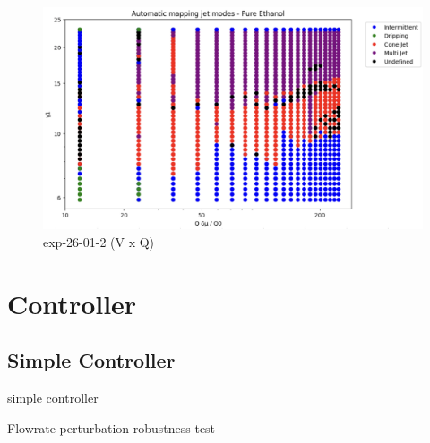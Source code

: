            \begin{figure}[H]
                \center
                \includegraphics[width=12cm]{Figuras/19:03/non-dimensional-1.png}
                \caption{ exp-26-01-2 (V x Q)}
            \end{figure}

\section{Controller}
\label{sec:controller_results}


    \subsection{Simple Controller}

        \begin{algorithm}
            \caption{simple controller}\label{alg:simple_controller}
            \begin{algorithmic}
                
                    \State {}
                    \State {}
                \EndIf

            \EndFunction
            \end{algorithmic}
        \end{algorithm}

        Flowrate perturbation robustness test


